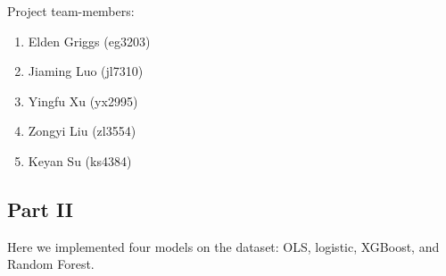 \documentclass[letterpaper]{article}
\begin{document}
		Project team-members:
		
		\begin{enumerate}
			\item Elden Griggs (eg3203)
			\item Jiaming Luo (jl7310)
			\item Yingfu Xu (yx2995)
			\item Zongyi Liu (zl3554)
			\item Keyan Su (ks4384)
			
		\end{enumerate}
		
		\clearpage
		\subsection{Part II}
		
		Here we implemented four models on the dataset: OLS, logistic, XGBoost, and Random Forest.
\end{document}
